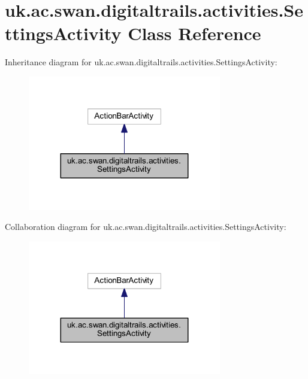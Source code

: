 \hypertarget{classuk_1_1ac_1_1swan_1_1digitaltrails_1_1activities_1_1_settings_activity}{\section{uk.\+ac.\+swan.\+digitaltrails.\+activities.\+Settings\+Activity Class Reference}
\label{classuk_1_1ac_1_1swan_1_1digitaltrails_1_1activities_1_1_settings_activity}
}


Inheritance diagram for uk.\+ac.\+swan.\+digitaltrails.\+activities.\+Settings\+Activity\+:\nopagebreak
\begin{figure}[H]
\begin{center}
\leavevmode
\includegraphics[width=239pt]{classuk_1_1ac_1_1swan_1_1digitaltrails_1_1activities_1_1_settings_activity__inherit__graph}
\end{center}
\end{figure}


Collaboration diagram for uk.\+ac.\+swan.\+digitaltrails.\+activities.\+Settings\+Activity\+:\nopagebreak
\begin{figure}[H]
\begin{center}
\leavevmode
\includegraphics[width=239pt]{classuk_1_1ac_1_1swan_1_1digitaltrails_1_1activities_1_1_settings_activity__coll__graph}
\end{center}
\end{figure}
